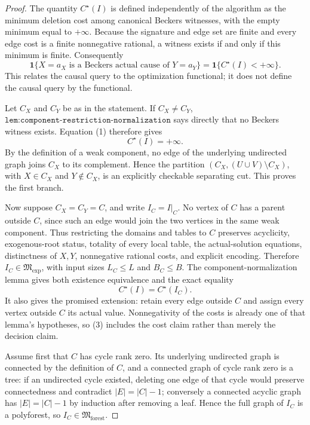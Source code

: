 \documentclass{article}
\begin{document}
\begin{proof}
The quantity \(C^\star(I)\) is defined independently of the algorithm as the minimum deletion cost among canonical Beckers witnesses, with the empty minimum equal to \(+\infty\).  Because the signature and edge set are finite and every edge cost is a finite nonnegative rational, a witness exists if and only if this minimum is finite.  Consequently
\[
 \mathbf 1\{X=a_X\text{ is a Beckers actual cause of }Y=a_Y\}
 =\mathbf 1\{C^\star(I)<+\infty\}.                                      \tag{1}
\]
This relates the causal query to the optimization functional; it does not define the causal query by the functional.

Let \(C_X\) and \(C_Y\) be as in the statement.  If \(C_X\ne C_Y\), \(\texttt{lem:component-restriction-normalization}\) says directly that no Beckers witness exists.  Equation (1) therefore gives
\[
 C^\star(I)=+\infty.                                                       \tag{2}
\]
By the definition of a weak component, no edge of the underlying undirected graph joins \(C_X\) to its complement.  Hence the partition \((C_X,(U\cup V)\setminus C_X)\), with \(X\in C_X\) and \(Y\notin C_X\), is an explicitly checkable separating cut.  This proves the first branch.

Now suppose \(C_X=C_Y=C\), and write \(I_C=I|_C\).  No vertex of \(C\) has a parent outside \(C\), since such an edge would join the two vertices in the same weak component.  Thus restricting the domains and tables to \(C\) preserves acyclicity, exogenous-root status, totality of every local table, the actual-solution equations, distinctness of \(X,Y\), nonnegative rational costs, and explicit encoding.  Therefore \(I_C\in\mathfrak M_{\mathrm{exp}}\), with input sizes \(L_C\le L\) and \(B_C\le B\).  The component-normalization lemma gives both existence equivalence and the exact equality
\[
 C^\star(I)=C^\star(I_C).                                                  \tag{3}
\]
It also gives the promised extension: retain every edge outside \(C\) and assign every vertex outside \(C\) its actual value.  Nonnegativity of the costs is already one of that lemma's hypotheses, so (3) includes the cost claim rather than merely the decision claim.

Assume first that \(C\) has cycle rank zero.  Its underlying undirected graph is connected by the definition of \(C\), and a connected graph of cycle rank zero is a tree: if an undirected cycle existed, deleting one edge of that cycle would preserve connectedness and contradict \(|E|=|C|-1\); conversely a connected acyclic graph has \(|E|=|C|-1\) by induction after removing a leaf.  Hence the full graph of \(I_C\) is a polyforest, so \(I_C\in\mathfrak M_{\mathrm{forest}}\).


\end{proof}
\end{document}
